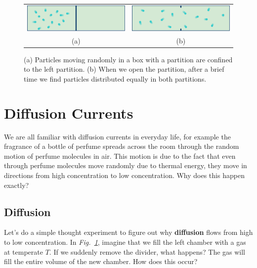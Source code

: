 \begin{figure}[t]
\centering
\begin{tabular}{cc}
\includegraphics[width=.45\columnwidth]{partition_closed} &
\includegraphics[width=.45\columnwidth]{partition_open}\\ 
 (a) & (b)\\
\end{tabular}
\caption{(a)  Particles moving randomly in a box with a partition are confined to the left partition.  (b)  When we open the partition, after a brief time we find particles distributed equally in both partitions.}
\label{fig:slide46}
\end{figure}
\section{Diffusion Currents}
We are all familiar with diffusion currents in everyday life, for example the fragrance of a bottle of perfume spreads across the room through the random motion of perfume molecules in air.  This motion is due to the fact that even through perfume molecules move randomly due to thermal energy, they move in directions from high concentration to low concentration.  Why does this happen exactly?
\subsection{Diffusion}
Let’s do a simple thought experiment to figure out why \textbf{diffusion} flows from high to low concentration.  In \emph{Fig.~\ref{fig:slide46}}, imagine that we fill the left chamber with a gas at temperate $T$. If we suddenly remove the divider, what happens?  The gas will fill the entire volume of the new chamber. How does this occur?


